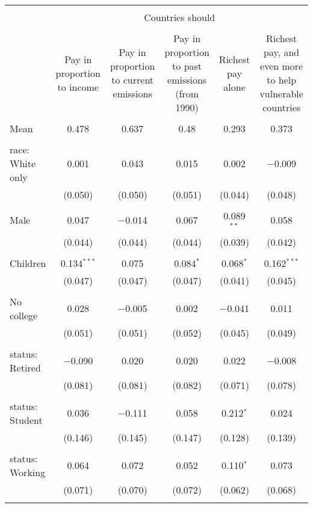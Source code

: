 
\begin{tabular}{@{\extracolsep{5pt}}lccccc} 
\\[-1.8ex]\hline 
\hline \\[-1.8ex] 
 & \multicolumn{5}{c}{Countries should} \\ 
\cline{2-6} 
\\[-1.8ex] & Pay in proportion to income & Pay in proportion to current emissions & Pay in proportion to past emissions (from 1990) & Richest pay alone & Richest pay, and even more to help vulnerable countries \\ 
\hline \\[-1.8ex] 
 Mean & 0.478 & 0.637 & 0.48 & 0.293 & 0.373  \\ \hline \\[-1.8ex] race: White only & 0.001 & 0.043 & 0.015 & 0.002 & $-$0.009 \\ 
  & (0.050) & (0.050) & (0.051) & (0.044) & (0.048) \\ 
  & & & & & \\ 
 Male & 0.047 & $-$0.014 & 0.067 & 0.089$^{**}$ & 0.058 \\ 
  & (0.044) & (0.044) & (0.044) & (0.039) & (0.042) \\ 
  & & & & & \\ 
 Children & 0.134$^{***}$ & 0.075 & 0.084$^{*}$ & 0.068$^{*}$ & 0.162$^{***}$ \\ 
  & (0.047) & (0.047) & (0.047) & (0.041) & (0.045) \\ 
  & & & & & \\ 
 No college & 0.028 & $-$0.005 & 0.002 & $-$0.041 & 0.011 \\ 
  & (0.051) & (0.051) & (0.052) & (0.045) & (0.049) \\ 
  & & & & & \\ 
 status: Retired & $-$0.090 & 0.020 & 0.020 & 0.022 & $-$0.008 \\ 
  & (0.081) & (0.081) & (0.082) & (0.071) & (0.078) \\ 
  & & & & & \\ 
 status: Student & 0.036 & $-$0.111 & 0.058 & 0.212$^{*}$ & 0.024 \\ 
  & (0.146) & (0.145) & (0.147) & (0.128) & (0.139) \\ 
  & & & & & \\ 
 status: Working & 0.064 & 0.072 & 0.052 & 0.110$^{*}$ & 0.073 \\ 
  & (0.071) & (0.070) & (0.072) & (0.062) & (0.068) \\ 
  & & & & & \\ 

\end{tabular}
